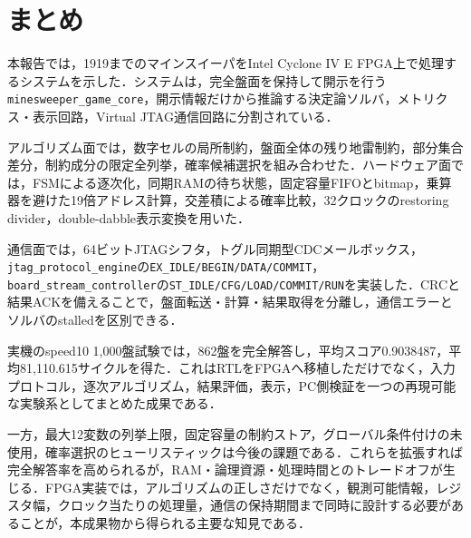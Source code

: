 \chapter{まとめ}
\label{chap:conclusion}

本報告では，19\times19までのマインスイーパをIntel Cyclone IV E FPGA上で処理するシステムを示した．システムは，完全盤面を保持して開示を行う\texttt{minesweeper\_game\_core}，開示情報だけから推論する決定論ソルバ，メトリクス・表示回路，Virtual JTAG通信回路に分割されている．

アルゴリズム面では，数字セルの局所制約，盤面全体の残り地雷制約，部分集合差分，制約成分の限定全列挙，確率候補選択を組み合わせた．ハードウェア面では，FSMによる逐次化，同期RAMの待ち状態，固定容量FIFOとbitmap，乗算器を避けた19倍アドレス計算，交差積による確率比較，32クロックのrestoring divider，double-dabble表示変換を用いた．

通信面では，64ビットJTAGシフタ，トグル同期型CDCメールボックス，\texttt{jtag\_protocol\_engine}の\texttt{EX\_IDLE/BEGIN/DATA/COMMIT}，\texttt{board\_stream\_controller}の\texttt{ST\_IDLE/CFG/LOAD/COMMIT/RUN}を実装した．CRCと結果ACKを備えることで，盤面転送・計算・結果取得を分離し，通信エラーとソルバのstalledを区別できる．

実機のspeed10 1,000盤試験では，862盤を完全解答し，平均スコア0.9038487，平均81,110.615サイクルを得た．これはRTLをFPGAへ移植しただけでなく，入力プロトコル，逐次アルゴリズム，結果評価，表示，PC側検証を一つの再現可能な実験系としてまとめた成果である．

一方，最大12変数の列挙上限，固定容量の制約ストア，グローバル条件付けの未使用，確率選択のヒューリスティックは今後の課題である．これらを拡張すれば完全解答率を高められるが，RAM・論理資源・処理時間とのトレードオフが生じる．FPGA実装では，アルゴリズムの正しさだけでなく，観測可能情報，レジスタ幅，クロック当たりの処理量，通信の保持期間まで同時に設計する必要があることが，本成果物から得られる主要な知見である．
